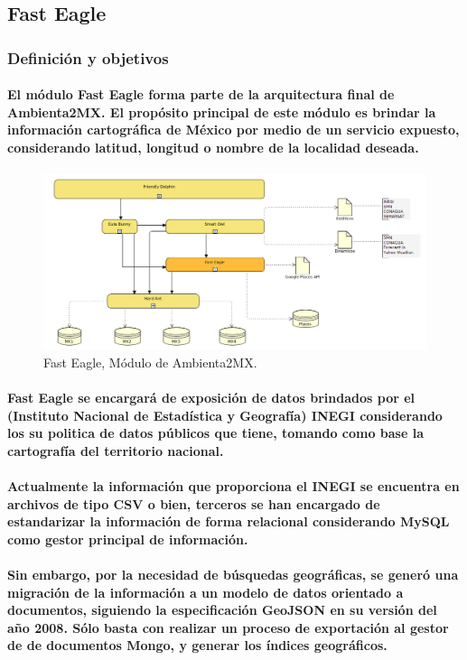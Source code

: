 \subsection{Fast Eagle}
  \subsubsection{Definición y objetivos}
    \paragraph{El módulo Fast Eagle forma parte de la arquitectura final de Ambienta2MX. El propósito principal de este módulo es brindar la información cartográfica de México por medio de un servicio expuesto, considerando latitud, longitud o nombre de la localidad deseada.}
    \begin{figure}[h!]
        \centering
          \includegraphics[width=\textwidth]{./images/DiagramaAmbienta2MX_FastEagle.png}
        \caption{Fast Eagle, Módulo de Ambienta2MX.}
    \end{figure}
    \paragraph{Fast Eagle se encargará de exposición de datos brindados por el (Instituto Nacional de Estadística y Geografía) INEGI considerando los su politica de datos públicos que tiene, tomando como base la cartografía del territorio nacional.}
    \paragraph{Actualmente la información que proporciona el INEGI se encuentra en archivos de tipo CSV o bien, terceros se han encargado de estandarizar la información de forma relacional considerando MySQL como gestor principal de información.}
    \paragraph{Sin embargo, por la necesidad de búsquedas geográficas, se generó una migración de la información a un modelo de datos orientado a documentos, siguiendo la especificación GeoJSON en su versión del año 2008. Sólo basta con realizar un proceso de exportación al gestor de de documentos Mongo, y generar los índices geográficos. \cite{35}}
